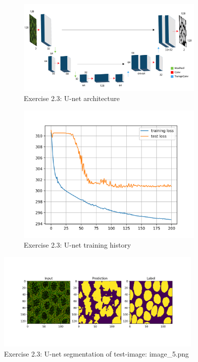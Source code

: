 \documentclass[a4paper,10pt]{article}
\begin{document}
\begin{figure}[htbp]
 \begin{subfigure}{0.65\textwidth}
    \includegraphics[width=\textwidth]{figures/assignment_3/unet.pdf}
    \caption{Exercise 2.3: U-net architecture}
    \label{fig:unet}
  \end{subfigure}
  \hfill
  \begin{subfigure}{0.35\textwidth}
    \includegraphics[width=\textwidth]{figures/assignment_3/segmentation_unet.png}
    \caption{Exercise 2.3: U-net training history}
    \label{fig:unethist}
  \end{subfigure}
  \label{fig:both_images}
  \caption{}
\end{figure}

\begin{figure}[ht!]
\centering
\includegraphics[width=100mm]{figures/assignment_3/segmentation_im5_unet.png}
\caption{Exercise 2.3: U-net segmentation of test-image: image\_5.png}
\label{fig:unet5}
\end{figure}
\end{document}
